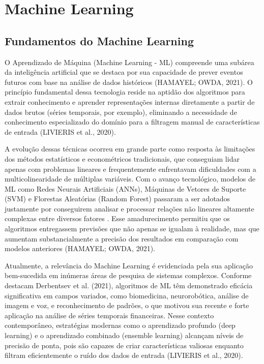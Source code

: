 \section{Machine Learning}
\label{sec_machine_learning}

\subsection{Fundamentos do Machine Learning}
\label{subsec_fundamentos_do_machine_learning}

O Aprendizado de Máquina (Machine Learning - ML) compreende uma subárea da inteligência artificial que se destaca por sua capacidade de prever eventos futuros com base na análise de dados históricos (HAMAYEL; OWDA, 2021). O princípio fundamental dessa tecnologia reside na aptidão dos algoritmos para extrair conhecimento e aprender representações internas diretamente a partir de dados brutos (séries temporais, por exemplo), eliminando a necessidade de conhecimento especializado do domínio para a filtragem manual de características de entrada (LIVIERIS et al., 2020).

A evolução dessas técnicas ocorreu em grande parte como resposta às limitações dos métodos estatísticos e econométricos tradicionais, que conseguiam lidar apenas com problemas lineares e frequentemente enfrentavam dificuldades com a multicolinearidade de múltiplas variáveis. Com o avanço tecnológico, modelos de ML como Redes Neurais Artificiais (ANNs), Máquinas de Vetores de Suporte (SVM) e Florestas Aleatórias (Random Forest) passaram a ser adotados justamente por conseguirem analisar e processar relações não lineares altamente complexas entre diversos fatores \cite{park2023intelligent}. Esse amadurecimento permitiu que os algoritmos entregassem previsões que não apenas se igualam à realidade, mas que aumentam substancialmente a precisão dos resultados em comparação com modelos anteriores (HAMAYEL; OWDA, 2021).

Atualmente, a relevância do Machine Learning é evidenciada pela sua aplicação bem-sucedida em inúmeras áreas de pesquisa de sistemas complexos. Conforme destacam Derbentsev et al. (2021), algoritmos de ML têm demonstrado eficácia significativa em campos variados, como biomedicina, neurorobótica, análise de imagem e voz, e reconhecimento de padrões, o que motivou sua recente e forte aplicação na análise de séries temporais financeiras. Nesse contexto contemporâneo, estratégias modernas como o aprendizado profundo (deep learning) e o aprendizado combinado (ensemble learning) alcançam níveis de precisão de ponta, pois são capazes de criar características valiosas enquanto filtram eficientemente o ruído dos dados de entrada (LIVIERIS et al., 2020).

